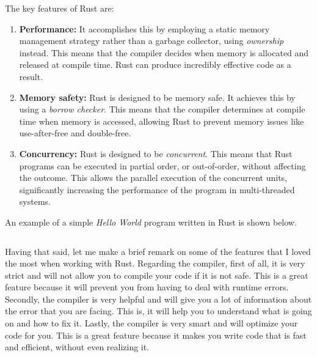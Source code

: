 The key features of Rust are:

\begin{enumerate}
    \itemsep0.5em
    \item \textbf{Performance:} It accomplishes this by employing a static memory management strategy rather than a garbage collector, using \textit{ownership} instead. This means that the compiler decides when memory is allocated and released at compile time. Rust can produce incredibly effective code as a result.
    \item \textbf{Memory safety:} Rust is designed to be memory safe. It achieves this by using a \textit{borrow checker}. This means that the compiler determines at compile time when memory is accessed, allowing Rust to prevent memory issues like use-after-free and double-free.
    \item \textbf{Concurrency:} Rust is designed to be \textit{concurrent}. This means that Rust programs can be executed in partial order, or out-of-order, without affecting the outcome. This allows the parallel execution of the concurrent units, significantly increasing the performance of the program in multi-threaded systems.
\end{enumerate}

An example of a simple \textit{Hello World} program written in Rust is shown below.

\begin{code}
    \inputminted{rust}{code/listings/9-1_helloWorld.rs}
\end{code}

Having that said, let me make a brief remark on some of the features that I loved the most when working with Rust. Regarding the compiler, first of all, it is very strict and will not allow you to compile your code if it is not safe. This is a great feature because it will prevent you from having to deal with runtime errors. Secondly, the compiler is very helpful and will give you a lot of information about the error that you are facing. This is, it will help you to understand what is going on and how to fix it. Lastly, the compiler is very smart and will optimize your code for you. This is a great feature because it makes you write code that is fast and efficient, without even realizing it.

